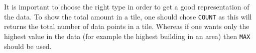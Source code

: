 It is important to choose the right type in order to get a good representation of the data. To show the total amount in a tile, one should chose \lstinline|COUNT| as this will returns the total number of data points in a tile. Whereas if one wants only the highest value in the data (for example the highest building in an area) then \lstinline|MAX| should be used.
